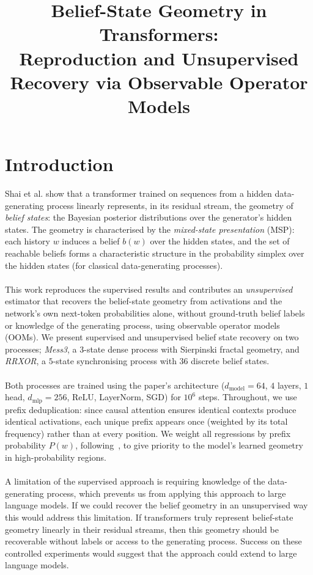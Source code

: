 \documentclass[11pt]{article}
\title{\vspace{-2.5em}Belief-State Geometry in Transformers:\\
Reproduction and Unsupervised Recovery via Observable Operator Models}
\author{}
\date{}
\begin{document}
\maketitle
\vspace{-3em}

\section{Introduction}

Shai et al.\cite{shai2024} show that a transformer trained on sequences from a hidden
data-generating process linearly represents, in its residual stream, the geometry of \emph{belief states}: 
the Bayesian posterior distributions over the generator's hidden states. The geometry is characterised by 
the \emph{mixed-state presentation} (MSP): each history $w$ induces a belief $b(w)$ over the hidden states, 
and the set of reachable beliefs forms a characteristic structure in the probability simplex over the 
hidden states (for classical data-generating processes)\cite{riechers2025}.
\\\\
This work reproduces the supervised results and contributes an \emph{unsupervised} estimator
that recovers the belief-state geometry from activations and the network's own next-token
probabilities alone, without ground-truth belief labels or knowledge of the generating
process, using observable operator models (OOMs).
We present supervised and unsupervised belief state recovery on two processes; \emph{Mess3}, a
$3$-state dense process with Sierpinski fractal geometry, and \emph{RRXOR}, a $5$-state
synchronising process with $36$ discrete belief states.
\\\\
Both processes are trained using the paper's architecture ($d_{\mathrm{model}}{=}64$, $4$ layers,
$1$ head, $d_{\mathrm{mlp}}{=}256$, ReLU, LayerNorm, SGD) for $10^6$ steps.
Throughout, we use prefix deduplication: since causal attention ensures identical contexts
produce identical activations, each unique prefix appears once (weighted by its total frequency)
rather than at every position. We weight all regressions by prefix probability $P(w)$, following~\cite{riechers2025}, 
to give priority to the model's learned geometry in high-probability regions.
\\\\
A limitation of the supervised approach is requiring knowledge of the data-generating process, which prevents us 
from applying this approach to large language models. If we could recover the belief geometry in an unsupervised 
way this would address this limitation. If transformers truly represent belief-state geometry linearly in their 
residual streams, then this geometry should be recoverable without labels or access to the generating process. 
Success on these controlled experiments would suggest that the approach could extend to large language
models.
\end{document}

